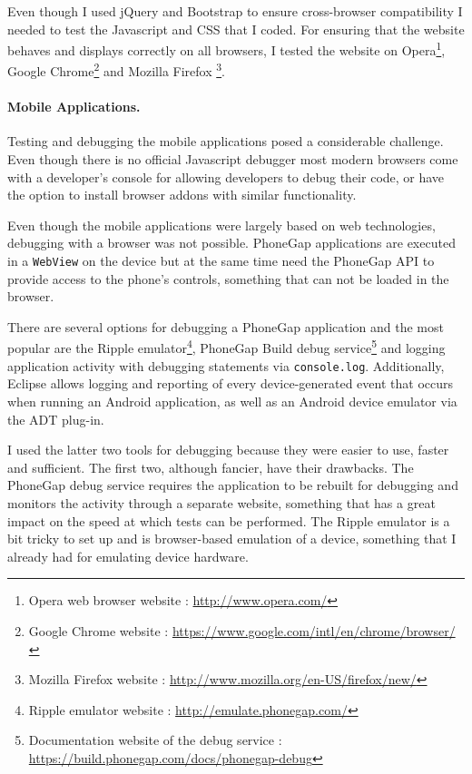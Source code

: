 \documentclass[12pt]{ecsproject}     %
\begin{document}
Even though I used jQuery and Bootstrap to ensure cross-browser compatibility I needed to test the Javascript and CSS that I coded. For ensuring that the website behaves and displays correctly on all browsers, I tested the website on Opera\footnote{Opera web browser website : \href{http://www.opera.com/}{http://www.opera.com/}}, Google Chrome\footnote{Google Chrome website : \href{https://www.google.com/intl/en/chrome/browser/}{https://www.google.com/intl/en/chrome/browser/} } and Mozilla Firefox \footnote{Mozilla Firefox website : \href{http://www.mozilla.org/en-US/firefox/new/}{http://www.mozilla.org/en-US/firefox/new/}}.

\paragraph{Mobile Applications.}
Testing and debugging the mobile applications posed a considerable challenge. Even though there is no official Javascript debugger \citep[p.~14]{jsninja} most modern browsers come with a developer's console for allowing developers to debug their code, or have the option to install browser addons with similar functionality.

Even though the mobile applications were largely based on web technologies, debugging with a browser was not possible. PhoneGap applications are executed in a \texttt{WebView} on the device but at the same time need the PhoneGap API to provide access to the phone's controls, something that can not be loaded in the browser. 

There are several options for debugging a PhoneGap application and the most popular are the Ripple emulator\footnote{Ripple emulator website : \href{http://emulate.phonegap.com/}{http://emulate.phonegap.com/}}, PhoneGap Build debug service\footnote{Documentation website of the debug service : \href{https://build.phonegap.com/docs/phonegap-debug}{https://build.phonegap.com/docs/phonegap-debug}} and logging application activity with debugging statements via \texttt{console.log}. Additionally, Eclipse allows logging and reporting of every device-generated event that occurs when running an Android application, as well as an Android device emulator via the ADT plug-in.

I used the latter two tools for debugging because they were easier to use, faster and sufficient. The first two, although fancier, have their drawbacks. The PhoneGap debug service requires the application to be rebuilt for debugging and monitors the activity through a separate website, something that has a great impact on the speed at which tests can be performed. The Ripple emulator is a bit tricky to set up and is browser-based emulation of a device, something that I already had for emulating device hardware.
\end{document}
